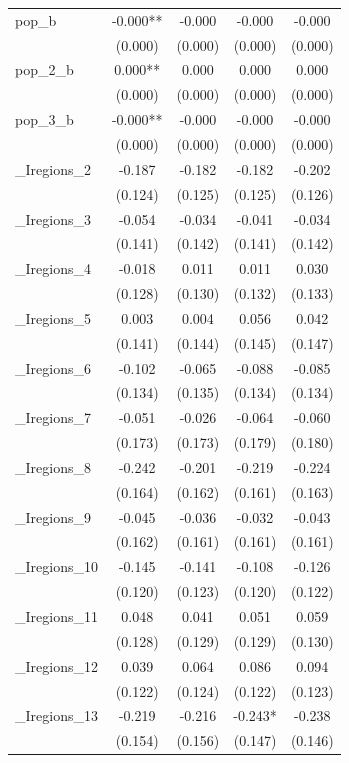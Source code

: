 \documentclass[]{article}
\begin{document}
\begin{tabular}{lcccc}
pop\_b & -0.000** & -0.000 & -0.000 & -0.000 \\
 & (0.000) & (0.000) & (0.000) & (0.000) \\
pop\_2\_b & 0.000** & 0.000 & 0.000 & 0.000 \\
 & (0.000) & (0.000) & (0.000) & (0.000) \\
pop\_3\_b & -0.000** & -0.000 & -0.000 & -0.000 \\
 & (0.000) & (0.000) & (0.000) & (0.000) \\
\_Iregions\_2 & -0.187 & -0.182 & -0.182 & -0.202 \\
 & (0.124) & (0.125) & (0.125) & (0.126) \\
\_Iregions\_3 & -0.054 & -0.034 & -0.041 & -0.034 \\
 & (0.141) & (0.142) & (0.141) & (0.142) \\
\_Iregions\_4 & -0.018 & 0.011 & 0.011 & 0.030 \\
 & (0.128) & (0.130) & (0.132) & (0.133) \\
\_Iregions\_5 & 0.003 & 0.004 & 0.056 & 0.042 \\
 & (0.141) & (0.144) & (0.145) & (0.147) \\
\_Iregions\_6 & -0.102 & -0.065 & -0.088 & -0.085 \\
 & (0.134) & (0.135) & (0.134) & (0.134) \\
\_Iregions\_7 & -0.051 & -0.026 & -0.064 & -0.060 \\
 & (0.173) & (0.173) & (0.179) & (0.180) \\
\_Iregions\_8 & -0.242 & -0.201 & -0.219 & -0.224 \\
 & (0.164) & (0.162) & (0.161) & (0.163) \\
\_Iregions\_9 & -0.045 & -0.036 & -0.032 & -0.043 \\
 & (0.162) & (0.161) & (0.161) & (0.161) \\
\_Iregions\_10 & -0.145 & -0.141 & -0.108 & -0.126 \\
 & (0.120) & (0.123) & (0.120) & (0.122) \\
\_Iregions\_11 & 0.048 & 0.041 & 0.051 & 0.059 \\
 & (0.128) & (0.129) & (0.129) & (0.130) \\
\_Iregions\_12 & 0.039 & 0.064 & 0.086 & 0.094 \\
 & (0.122) & (0.124) & (0.122) & (0.123) \\
\_Iregions\_13 & -0.219 & -0.216 & -0.243* & -0.238 \\
 & (0.154) & (0.156) & (0.147) & (0.146) \\

\end{tabular}
\end{document}
